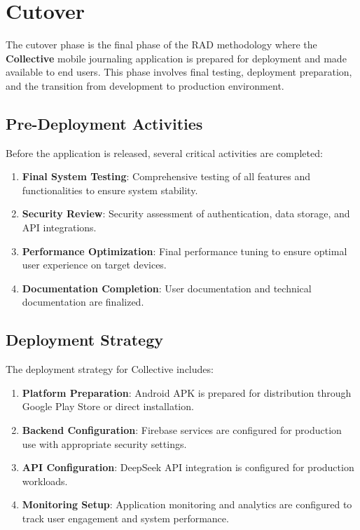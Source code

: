\section{Cutover}\label{sec:cutover}

The cutover phase is the final phase of the RAD methodology where the \textbf{Collective} mobile journaling application is prepared for deployment and made available to end users. This phase involves final testing, deployment preparation, and the transition from development to production environment.

\subsection{Pre-Deployment Activities}\label{subsec:preDeployment}

Before the application is released, several critical activities are completed:

\begin{enumerate}
    \item \textbf{Final System Testing}: Comprehensive testing of all features and functionalities to ensure system stability.
    
    \item \textbf{Security Review}: Security assessment of authentication, data storage, and API integrations.
    
    \item \textbf{Performance Optimization}: Final performance tuning to ensure optimal user experience on target devices.
    
    \item \textbf{Documentation Completion}: User documentation and technical documentation are finalized.
\end{enumerate}

\subsection{Deployment Strategy}\label{subsec:deploymentStrategy}

The deployment strategy for Collective includes:

\begin{enumerate}
    \item \textbf{Platform Preparation}: Android APK is prepared for distribution through Google Play Store or direct installation.
    
    \item \textbf{Backend Configuration}: Firebase services are configured for production use with appropriate security settings.
    
    \item \textbf{API Configuration}: DeepSeek API integration is configured for production workloads.
    
    \item \textbf{Monitoring Setup}: Application monitoring and analytics are configured to track user engagement and system performance.
\end{enumerate}


